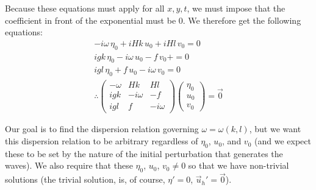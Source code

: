 Because these equations must apply for all $x,y,t$, we must impose that the coefficient in front of the exponential must be $0$. We therefore get the following equations:
\begin{align*}
    -i\omega\,\eta_0 + iHk\,u_0+iHl\,v_0 =0
    \\
    igk\,\eta_0-i\omega\, u_0-f\,v_0+ =0
    \\
    igl\,\eta_0+f\,u_0-i\omega \,v_0=0
    \\
    \therefore
    \left( \begin{array}{ccc}
        -\omega & Hk & Hl \\
        igk & -i\omega & -f\\
        igl & f & -i\omega
    \end{array} \right)
    \left( \begin{array}{c}
        \eta_0\\
        u_0\\
        v_0
    \end{array} \right)
    =\vec{0}
\end{align*}

Our goal is to find the dispersion relation governing $\omega=\omega(k,l)$, but we want this dispersion relation to be arbitrary regardless of $\eta_0$, $u_0$, and $v_0$ (and we expect these to be set by the nature of the initial perturbation that generates the waves). We also require that these $\eta_0$, $u_0$, $v_0\neq 0$ so that we have non-trivial solutions (the trivial solution, is, of course, $\eta'=0$, $\vec{u}_h'=\vec{0}$).

